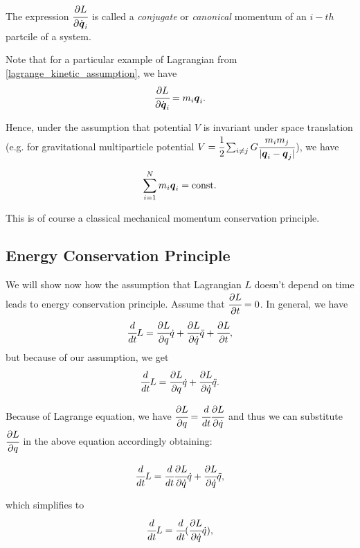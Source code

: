 \documentclass[main.tex]{subfiles}
\begin{document}
The expression $\cfrac{\partial L}{\partial \dot{\boldsymbol{q}}_i}$ is called a \textit{conjugate} or \textit{canonical} momentum of an $i-th$ partcile of a system.

Note that for a particular example of Lagrangian from \ref{lagrange_kinetic_assumption},
we have 
\begin{equation}
\cfrac{\partial L}{\partial \dot{\boldsymbol{q}}_i} = m_i \boldsymbol{q}_i.
\end{equation}

Hence, under the assumption that potential $V$ is invariant under space translation (e.g. for gravitational multiparticle potential $V = \cfrac{1}{2}\sum_{i \not=j} G \cfrac{m_i m_j}{|\boldsymbol{q}_i - \boldsymbol{q}_j|}$), we have

\begin{equation}
\sum_{i=1}^{N}  m_i \boldsymbol{q}_i = \text{const}.
\end{equation} 

This is of course a classical mechanical momentum conservation principle.
\subsection{Energy Conservation Principle}
We will show now how the assumption that Lagrangian $L$ doesn't depend on time leads to energy conservation principle.
Assume that $\cfrac{\partial L}{\partial t} = 0$.
In general, we have
\begin{equation}
\cfrac{d}{dt} L = \cfrac{\partial L}{\partial q}\dot{q} + \cfrac{\partial L}{\partial \dot{q}}\ddot{q} + \cfrac{\partial L}{\partial t},
\end{equation}
but because of our assumption, we get
\begin{equation}
\cfrac{d}{dt} L = \cfrac{\partial L}{\partial q}\dot{q} + \cfrac{\partial L}{\partial \dot{q}}\ddot{q}.
\end{equation}

Because of Lagrange equation, we have $\cfrac{\partial L}{\partial q} = \cfrac{d}{dt}\cfrac{\partial L}{\partial \dot{q}}$ and thus we can substitute $\cfrac{\partial L}{\partial q}$ in the above equation accordingly obtaining:

\begin{equation}
\cfrac{d}{dt} L = \cfrac{d}{dt}\cfrac{\partial L}{\partial \dot{q}}\dot{q} + \cfrac{\partial L}{\partial \dot{q}}\ddot{q},
\end{equation}

which simplifies to
\begin{equation}
\cfrac{d}{dt} L = \cfrac{d}{dt}(\cfrac{\partial L}{\partial \dot{q}}\dot{q}),
\end{equation}
\end{document}
